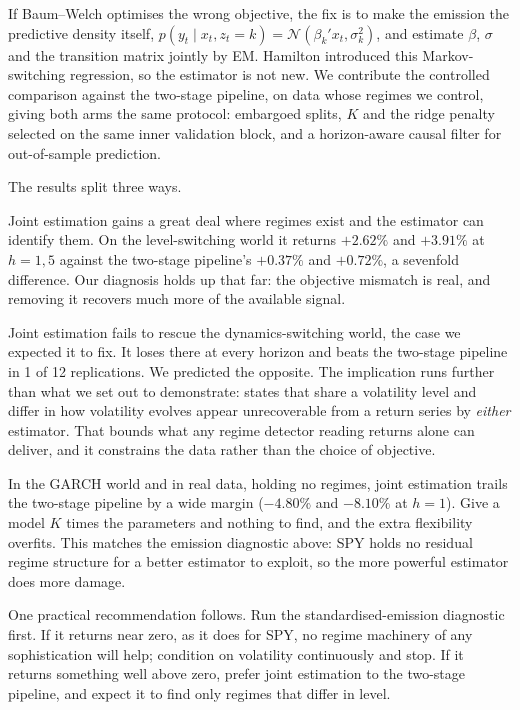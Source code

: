 \documentclass[sigconf,nonacm]{acmart}
\begin{document}


If Baum--Welch optimises the wrong objective, the fix is to make the emission the
predictive density itself,
$p(y_t \mid x_t, z_t{=}k) = \mathcal{N}(\beta_k' x_t, \sigma_k^2)$, and estimate
$\beta$, $\sigma$ and the transition matrix jointly by EM. Hamilton
\cite{hamilton1989} introduced this Markov-switching regression, so the estimator
is not new. We contribute the controlled comparison against the two-stage
pipeline, on data whose regimes we control, giving both arms the same protocol:
embargoed splits, $K$ and the ridge penalty selected on the same inner validation
block, and a horizon-aware causal filter for out-of-sample prediction.

The results split three ways.

Joint estimation gains a great deal where regimes exist and the estimator can
identify them. On the level-switching world it returns $+2.62\%$ and $+3.91\%$ at
$h=1,5$ against the two-stage pipeline's $+0.37\%$ and $+0.72\%$, a sevenfold
difference. Our diagnosis holds up that far: the objective mismatch is real, and
removing it recovers much more of the available signal.

Joint estimation fails to rescue the dynamics-switching world, the case we
expected it to fix. It loses there at every horizon and beats the two-stage
pipeline in 1 of 12 replications. We predicted the opposite. The implication runs
further than what we set out to demonstrate: states that share a volatility level
and differ in how volatility evolves appear unrecoverable from a return series by
\emph{either} estimator. That bounds what any regime detector reading returns
alone can deliver, and it constrains the data rather than the choice of
objective.

In the GARCH world and in real data, holding no regimes, joint estimation trails
the two-stage pipeline by a wide margin ($-4.80\%$ and $-8.10\%$ at
$h=1$). Give a model $K$ times the parameters and nothing to find, and the extra
flexibility overfits. This matches the emission diagnostic above: SPY holds no
residual regime structure for a better estimator to exploit, so the more powerful
estimator does more damage.

One practical recommendation follows. Run the standardised-emission diagnostic
first. If it returns near zero, as it does for SPY, no regime machinery of any
sophistication will help; condition on volatility continuously and stop. If it
returns something well above zero, prefer joint estimation to the two-stage
pipeline, and expect it to find only regimes that differ in level.
\end{document}
